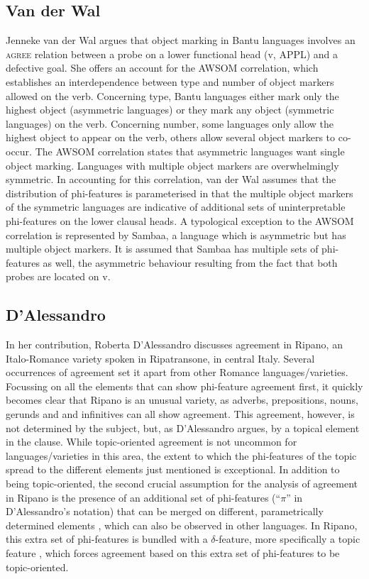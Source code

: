 \documentclass[output=paper
,modfonts
,nonflat]{langsci/langscibook}
\begin{document}
\subsection{Van der Wal}
\label{sec:vdwal}

Jenneke van der Wal argues that object marking in Bantu languages involves an \textsc{agree} relation between a probe on a lower functional head (v, APPL) and a defective goal. She offers an account for the AWSOM correlation, which establishes an interdependence between type and number of object markers allowed on the verb. Concerning type, Bantu languages either mark only the highest object (asymmetric languages) or they mark any object (symmetric languages) on the verb. Concerning number, some languages only allow the highest object to appear on the verb, others allow several object markers to co-occur. The AWSOM correlation states that asymmetric languages want single object marking. Languages with multiple object markers are overwhelmingly symmetric. In accounting for this correlation, van der Wal assumes that the distribution of phi-features is parameterised in that the multiple object markers of the symmetric languages are indicative of additional sets of uninterpretable phi-features on the lower clausal heads. A typological exception to the AWSOM correlation is represented by Sambaa, a language which is asymmetric but has multiple object markers. It is assumed that Sambaa has multiple sets of phi-features as well, the asymmetric behaviour resulting from the fact that both probes are located on v.

\subsection{D'Alessandro}
\label{sec:dalessandro}

In her contribution, Roberta D'Alessandro discusses agreement in Ripano, an Italo-Romance variety spoken in Ripatransone, in central Italy. Several occurrences of agreement set it apart from other Romance languages/varieties. Focussing on all the elements that can show phi-feature agreement first, it quickly becomes clear that Ripano is an unusual variety, as adverbs, prepositions, nouns, gerunds and and infinitives can all show agreement. This agreement, however, is not determined by the subject, but, as D'Alessandro argues, by a topical element in the clause. While topic-oriented agreement is not uncommon for languages/varieties in this area, the extent to which the phi-features of the topic spread to the different elements just mentioned is exceptional. In addition to being topic-oriented, the second crucial assumption for the analysis of agreement in Ripano is the presence of an additional set of phi-features (``$\pi$'' in D'Alessandro's notation) that can be merged on different, parametrically determined elements \citep{DAlessandro2017}, which can also be observed in other languages. In Ripano, this extra set of phi-features is bundled with a $\delta$-feature, more specifically a topic feature \citep{Miyagawa2017}, which forces agreement based on this extra set of phi-features to be topic-oriented.
\end{document}
